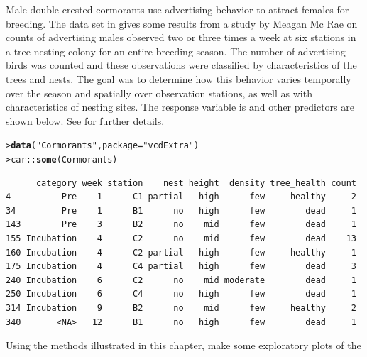 \documentclass[10pt]{report}\usepackage[]{graphicx}\usepackage[]{color}
\makeatletter
\newcommand{\hlstr}[1]{\textcolor[rgb]{0.192,0.494,0.8}{#1}}%
\newcommand{\hlopt}[1]{\textcolor[rgb]{0,0,0}{#1}}%
\newcommand{\hlstd}[1]{\textcolor[rgb]{0.345,0.345,0.345}{#1}}%
\newcommand{\hlkwc}[1]{\textcolor[rgb]{0.333,0.667,0.333}{#1}}%
\newcommand{\hlkwd}[1]{\textcolor[rgb]{0.737,0.353,0.396}{\textbf{#1}}}%
\newenvironment{kframe}{%
 \def\at@end@of@kframe{}%
 \ifinner\ifhmode%
  \def\at@end@of@kframe{\end{minipage}}%
  \begin{minipage}{\columnwidth}%
 \fi\fi%
 \def\FrameCommand##1{\hskip\@totalleftmargin \hskip-\fboxsep
 \colorbox{shadecolor}{##1}\hskip-\fboxsep
     \hskip-\linewidth \hskip-\@totalleftmargin \hskip\columnwidth}%
 \MakeFramed {\advance\hsize-\width
   \@totalleftmargin\z@ \linewidth\hsize
   \@setminipage}}%
 {\par\unskip\endMakeFramed%
 \at@end@of@kframe}
\newenvironment{knitrout}{}{} %
\renewenvironment{knitrout}{\small\renewcommand{\baselinestretch}{.85}}{} %
\makeatother
\begin{document}
\begin{Exercises}
  \exercise Male double-crested cormorants use advertising behavior to attract females for breeding.
	The  data set in  gives some results from a study by
	Meagan Mc Rae \citeyearpar{McRae:2015} on counts of advertising males observed two or three times a week
	at six stations in a tree-nesting colony for an entire breeding season.
	The number of advertising birds was counted and these observations were classified
	by characteristics of the trees and nests. The goal was to determine how this behavior varies 
	temporally over the season and spatially over observation stations, as well as with 
	characteristics of nesting sites.
	The response variable is 
	and other predictors are shown below.  See 
	for further details.
\begin{knitrout}\footnotesize
{}\color{fgcolor}\begin{kframe}
\begin{alltt}
\hlstd{> }\hlkwd{data}\hlstd{(}\hlstr{"Cormorants"}\hlstd{,} \hlkwc{package} \hlstd{=} \hlstr{"vcdExtra"}\hlstd{)}
\hlstd{> }\hlstd{car}\hlopt{::}\hlkwd{some}\hlstd{(Cormorants)}
\end{alltt}
\begin{verbatim}
      category week station    nest height  density tree_health count
4          Pre    1      C1 partial   high      few     healthy     2
34         Pre    1      B1      no   high      few        dead     1
143        Pre    3      B2      no    mid      few        dead     1
155 Incubation    4      C2      no    mid      few        dead    13
160 Incubation    4      C2 partial   high      few     healthy     1
175 Incubation    4      C4 partial   high      few        dead     3
240 Incubation    6      C2      no    mid moderate        dead     1
250 Incubation    6      C4      no   high      few        dead     1
314 Incubation    9      B2      no    mid      few     healthy     2
340       <NA>   12      B1      no   high      few        dead     1
\end{verbatim}
\end{kframe}
\end{knitrout}
	\begin{enumerate*}
		\item Using the methods illustrated in this chapter, make some exploratory plots of the

\end{enumerate*}
\end{Exercises}
\end{document}
